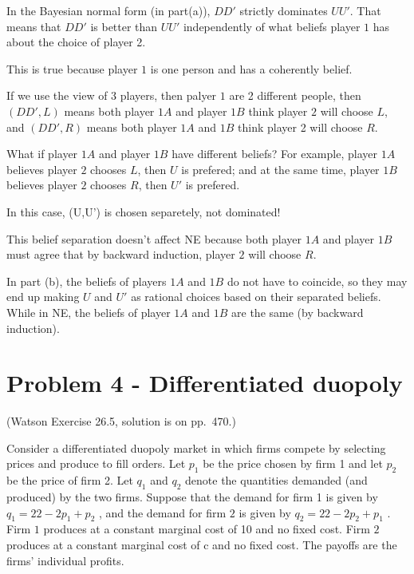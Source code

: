 \documentclass{article}
\begin{document}
\begin{mdframed}[backgroundcolor=blue!20,linecolor=white]
In the Bayesian normal form (in part(a)), $DD'$ strictly dominates $UU'$. That means that $DD'$ is better than $UU'$ independently of what beliefs player $1$ has about the choice of player 2. 

This is true because player $1$ is one person and has a coherently belief. 

\medskip

If we use the view of 3 players, then palyer $1$ are 2 different people, then $(DD',L)$ means both player $1A$ and player $1B$ think player $2$ will choose $L$, and $(DD',R)$ means both player $1A$ and $1B$ think player 2 will choose $R$.

\medskip

What if player $1A$ and player $1B$ have different beliefs? For example, player $1A$ believes player $2$ chooses $L$, then $U$ is prefered; and at the same time, player $1B$ believes player $2$ chooses $R$, then $U'$ is prefered.
\medskip

In this case, (U,U') is chosen separetely, not dominated!

\medskip

This belief separation  doesn't affect NE because both player $1A$ and player $1B$ must agree that by backward induction, player $2$ will choose $R$. 
\end{mdframed}

In part (b), the beliefs of players $1A$ and $1B$ do not have to
coincide, so they may end up making $U$ and $U'$ as rational choices based on their separated beliefs. While in NE, the beliefs of player $1A$ and $1B$ are the same (by backward induction).

\section{Problem 4 - Differentiated duopoly}

(Watson Exercise 26.5,  solution is on pp.~470.)

Consider a differentiated duopoly market in which firms compete by selecting
prices and produce to fill orders. Let $p_1$ be the price chosen by firm
1 and let $p_2$ be the price of firm 2. Let $q_1$ and $q_2$ denote the quantities demanded
(and produced) by the two firms. Suppose that the demand for firm
1 is given by $q_1 = 22 - 2p_1 + p_2$ , and the demand for firm $2$ is given by
$q_2 = 22 - 2p_2 + p_1$ . Firm $1$ produces at a constant marginal cost of 10 and
no fixed cost. Firm $2$ produces at a constant marginal cost of c and no fixed
cost. The payoffs are the firms' individual profits.
\end{document}
